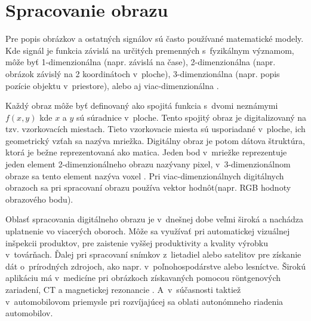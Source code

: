 
\section{Spracovanie obrazu}
\label{sec:imageprocessing}
Pre popis obrázkov a ostatných signálov sú často používané matematické modely.
Kde signál je funkcia závislá na určitých premenných s~fyzikálnym významom, môže byť 1-dimenzionálna (napr. závislá na čase),
2-dimenzionálna (napr. obrázok závislý na 2 koordinátoch v~ploche), 3-dimenzionálna (napr. popis pozície objektu v~priestore), alebo aj viac-dimenzionálna \cite{book:ImageProcessing}.

Každý obraz môže byť definovaný ako spojitá funkcia s~dvomi neznámymi $f(x,y)$ kde $x$ a $y$ sú súradnice v~ploche.
Tento spojitý obraz je digitalizovaný na tzv. vzorkovacích miestach.
Tieto vzorkovacie miesta sú usporiadané v~ploche, ich geometrický vzťah sa nazýva mriežka.
Digitálny obraz je potom dátova štruktúra, ktorá je bežne reprezentovaná ako matica.
Jeden bod v~mriežke reprezentuje jeden element 2-dimenzionálneho obrazu nazývany pixel, v~3-dimenzionálnom obraze sa tento element nazýva voxel \cite{book:ImageProcessing}.
Pri viac-dimenzionálnych digitálnych obrazoch sa pri spracovaní obrazu používa vektor hodnôt(napr. RGB hodnoty obrazového bodu).

Oblasť spracovania digitálneho obrazu je v~dnešnej dobe veľmi široká a nachádza uplatnenie vo viacerých oboroch.
Môže sa využívať pri automatickej vizuálnej inšpekcii produktov, pre zaistenie vyššej produktivity a kvality výrobku v~továrňach.
Ďalej pri spracovaní snímkov z~lietadiel alebo satelitov pre získanie dát o~prírodných zdrojoch, ako napr. v~poľnohospodárstve alebo lesníctve.
Širokú aplikáciu má v~medicíne pri obrázkoch získavaných pomocou röntgenových zariadení, CT a magnetickej rezonancie \cite{book:ImageProcessingApplication}.
A~v~súčasnosti taktiež v~automobilovom priemysle pri rozvíjajúcej sa oblati autonómneho riadenia automobilov.

